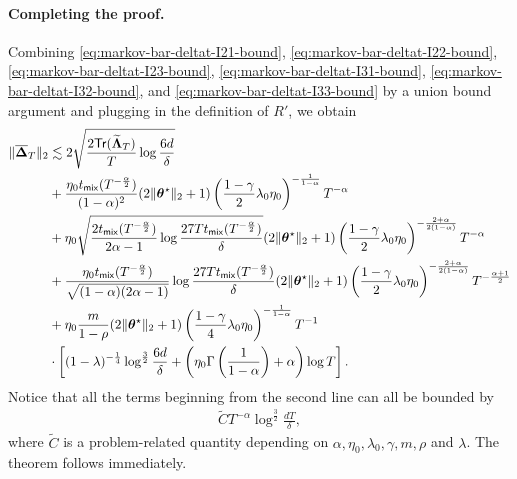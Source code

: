 \paragraph{Completing the proof.} Combining \eqref{eq:markov-bar-deltat-I21-bound}, \eqref{eq:markov-bar-deltat-I22-bound}, \eqref{eq:markov-bar-deltat-I23-bound}, \eqref{eq:markov-bar-deltat-I31-bound}, \eqref{eq:markov-bar-deltat-I32-bound}, and \eqref{eq:markov-bar-deltat-I33-bound} by a union bound argument and plugging in the definition of $R'$, we obtain
\begin{align*}
\|\overline{\bm{\Delta}}_T\|_2 &\lesssim 2\sqrt{\frac{2\mathsf{Tr}(\widetilde{\bm{\Lambda}}_T)}{T} \log \frac{6d}{\delta}} \\ 
&+ \frac{\eta_0t_{\mathsf{mix}}(T^{-\frac{\alpha}{2}})}{(1-\alpha)^2}  (2\|\bm{\theta}^\star\|_2+1)\left(\frac{1-\gamma}{2}\lambda_0\eta_0\right)^{-\frac{1}{1-\alpha}}T^{-\alpha} \\ 
&+ \eta_0 \sqrt{\frac{2t_{\mathsf{mix}}(T^{-\frac{\alpha}{2}})}{2\alpha-1}\log \frac{27T t_{\mathsf{mix}}(T^{-\frac{\alpha}{2}})}{\delta}}(2\|\bm{\theta}^\star\|_2+1)\left(\frac{1-\gamma}{2}\lambda_0\eta_0\right)^{-\frac{2+\alpha}{2(1-\alpha)}}T^{-\alpha} \\ 
&+ \frac{\eta_0t_{\mathsf{mix}}(T^{-\frac{\alpha}{2}})}{\sqrt{(1-\alpha)(2\alpha-1)}} \log \frac{27T t_{\mathsf{mix}}(T^{-\frac{\alpha}{2}})}{\delta}(2\|\bm{\theta}^\star\|_2+1)\left(\frac{1-\gamma}{2}\lambda_0\eta_0\right)^{-\frac{2+\alpha}{2(1-\alpha)}}T^{-\frac{\alpha+1}{2}} \\ 
&+ \eta_0 \frac{m}{1-\rho} (2\|\bm{\theta}^\star\|_2+1)\left(\frac{1-\gamma}{4}\lambda_0\eta_0\right)^{-\frac{1}{1-\alpha}}T^{-1} \\ 
&\cdot \left[(1-\lambda)^{-\frac{1}{4}}\log^{\frac{3}{2}}\frac{6d}{\delta} + \left(\eta_0 \Gamma\left(\frac{1}{1-\alpha}\right)+\alpha\right) \log T\right].
\end{align*}
Notice that all the terms beginning from the second line can all be bounded by
\begin{align*}
\widetilde{C}T^{-\alpha}\log^{\frac{3}{2}} \frac{dT}{\delta},
\end{align*}
where $\widetilde{C}$ is a problem-related quantity depending on $\alpha,\eta_0,\lambda_0, \gamma, m,\rho$ and $\lambda$. The theorem follows immediately.

